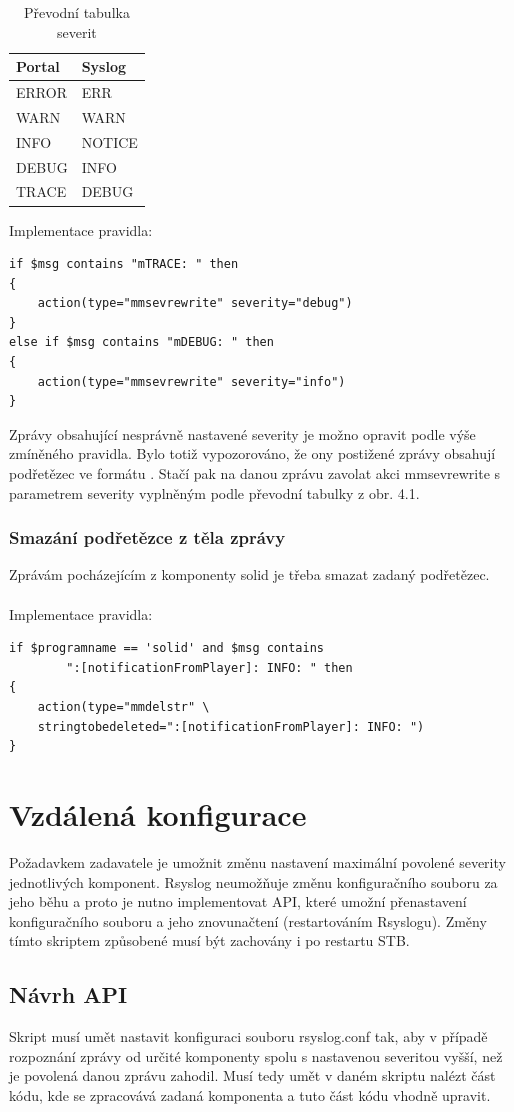 \documentclass[thesis=B,czech]{FITthesis}[2012/06/26]
\begin{document}
\begin{table}[H]
\centering
	\caption{Převodní tabulka severit}	\begin{tabular}{|l|l|}\hline
		Portal		& Syslog			\tabularnewline \hline \hline
		ERROR		& ERR			\tabularnewline \hline
		WARN		& WARN			\tabularnewline \hline
		INFO		& NOTICE			\tabularnewline \hline
		DEBUG		& INFO			\tabularnewline \hline
		TRACE		& DEBUG			\tabularnewline \hline
	\end{tabular}
\end{table}
Implementace pravidla:
\begin{lstlisting}[style=RainerScriptStyle]
if $msg contains "mTRACE: " then
{
	action(type="mmsevrewrite" severity="debug")
}
else if $msg contains "mDEBUG: " then
{
	action(type="mmsevrewrite" severity="info")
}
\end{lstlisting}
Zprávy obsahující nesprávně nastavené severity je možno opravit podle výše zmíněného pravidla. Bylo totiž vypozorováno, že ony postižené zprávy obsahují podřetězec ve formátu . Stačí pak na danou zprávu zavolat akci mmsevrewrite s parametrem severity vyplněným podle převodní tabulky z obr. 4.1.

\subsubsection{Smazání podřetězce z těla zprávy}
Zprávám pocházejícím z komponenty solid je třeba smazat zadaný podřetězec.
\\
\\
Implementace pravidla:
\begin{lstlisting}[style=RainerScriptStyle]
if $programname == 'solid' and $msg contains
		":[notificationFromPlayer]: INFO: " then
{
	action(type="mmdelstr" \ 
	stringtobedeleted=":[notificationFromPlayer]: INFO: ")
}
\end{lstlisting}


\section{Vzdálená konfigurace}
Požadavkem zadavatele je umožnit změnu nastavení maximální povolené severity jednotlivých komponent. Rsyslog neumožňuje změnu konfiguračního souboru za jeho běhu a proto je nutno implementovat API, které umožní přenastavení konfiguračního souboru a jeho znovunačtení (restartováním Rsyslogu).
Změny tímto skriptem způsobené musí být zachovány i po restartu STB.

\subsection{Návrh API}
Skript musí umět nastavit konfiguraci souboru rsyslog.conf tak, aby v případě rozpoznání zprávy od určité komponenty spolu s nastavenou severitou vyšší, než je povolená danou zprávu zahodil. 
Musí tedy umět v daném skriptu nalézt část kódu, kde se zpracovává zadaná komponenta a tuto část kódu vhodně upravit.
\end{document}
